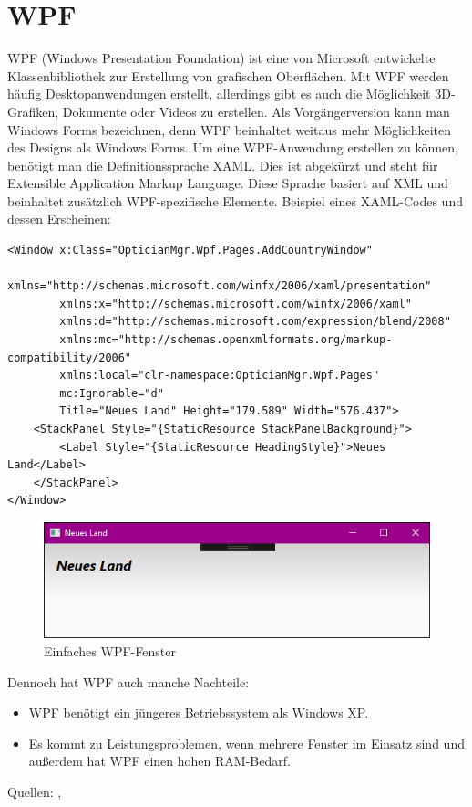 \section{WPF}
WPF (Windows Presentation Foundation) ist eine von Microsoft entwickelte Klassenbibliothek zur Erstellung von grafischen Oberflächen. Mit WPF werden häufig Desktop\-anwendungen erstellt, allerdings gibt es auch die Möglichkeit 3D-Grafiken, Dokumente oder Videos zu erstellen. Als Vorgängerversion kann man Windows Forms bezeichnen, denn WPF beinhaltet weitaus mehr Möglichkeiten des Designs als Windows Forms.
Um eine WPF-Anwendung erstellen zu können, benötigt man die Definitionssprache XAML. Dies ist abgekürzt und steht für Extensible Application Markup Language. Diese Sprache basiert auf XML und beinhaltet zusätzlich WPF-spezifische Elemente. \newline Beispiel eines XAML-Codes und dessen Erscheinen: 
\begin{lstlisting}
<Window x:Class="OpticianMgr.Wpf.Pages.AddCountryWindow"
        xmlns="http://schemas.microsoft.com/winfx/2006/xaml/presentation"
        xmlns:x="http://schemas.microsoft.com/winfx/2006/xaml"
        xmlns:d="http://schemas.microsoft.com/expression/blend/2008"
        xmlns:mc="http://schemas.openxmlformats.org/markup-compatibility/2006"
        xmlns:local="clr-namespace:OpticianMgr.Wpf.Pages"
        mc:Ignorable="d"
        Title="Neues Land" Height="179.589" Width="576.437">
    <StackPanel Style="{StaticResource StackPanelBackground}">
        <Label Style="{StaticResource HeadingStyle}">Neues Land</Label>
    </StackPanel>
</Window>
\end{lstlisting}
\begin{figure}[H]
\begin{center}
	\includegraphics[scale=.5]{images/Wpf.png}
\end{center}
	\caption{Einfaches WPF-Fenster}
	\label{fig:sample}
\end{figure}
Dennoch hat WPF auch manche Nachteile:
\begin{itemize}
\item WPF benötigt ein jüngeres Betriebssystem als Windows XP.
\item Es kommt zu Leistungsproblemen, wenn mehrere Fenster im Einsatz sind und außerdem hat WPF einen hohen RAM-Bedarf.
\end{itemize}
Quellen: \cite{it-visions_was_2018}, \cite{schwichtenberg_vor-_2018}
